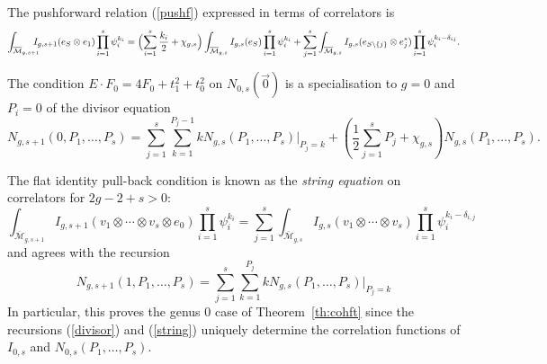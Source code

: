 \documentclass[11pt]{article}
\newcommand{\modm}{\mathcal{M}}
\theoremstyle{plain}
\theoremstyle{definition}
\begin{document}
The pushforward relation (\ref{pushf}) expressed in terms of correlators is \cite{ACNP}
$$
\int_{\overline{\modm}_{g,s+1}}\hspace{-3mm}I_{g,s+1}(e_S\otimes e_1)\prod_{i=1}^s\psi_i^{k_i}
=\Bigl(\sum_{i=1}^s \frac{k_i}{2}+\chi_{g,s}\Bigr)
\int_{\overline{\modm}_{g,s}}I_{g,s}(e_S)\prod_{i=1}^s\psi_i^{k_i}+\sum_{j=1}^s\int_{\overline{\modm}_{g,s}}I_{g,s}(e_{S\backslash\{j\}}\otimes e^*_j)\prod_{i=1}^s\psi_i^{k_i-\delta_{ij}}.
$$

The condition $E\cdot F_0=4F_0+t_1^2+t_0^2$ on $N_{0,s}(\vec{0})$ is a specialisation to $g=0$ and $P_i=0$ of the divisor equation \cite{NorStr}
\begin{equation}   \label{divisor}
N_{g,s+1}(0,P_1,\dots,P_s)=\sum_{j=1}^s\sum_{k=1}^{P_j-1}kN_{g,s}(P_1,...,P_s)|_{P_j=k}+\left(\frac{1}{2}\sum_{j=1}^s P_j+\chi_{g,s}\right)N_{g,s}(P_1,\dots,P_s).
\end{equation} 


The flat identity pull-back condition is known as the {\em string equation} on correlators for $2g-2+s>0$:
$$\int_{\overline{\modm}_{g,s+1}}I_{g,s+1}(v_1\otimes\cdots\otimes v_s\otimes e_0)\prod_{i=1}^s\psi_i^{k_i}
=\sum_{j=1}^s\int_{\overline{\modm}_{g,s}}I_{g,s}(v_1\otimes\cdots\otimes v_s)\prod_{i=1}^s\psi_i^{k_i-\delta_{i,j}}
$$
and agrees with the recursion \cite{NorStr}
\begin{equation}   \label{string}
N_{g,s+1}(1,P_1,\dots,P_s)=\sum_{j=1}^s\sum_{k=1}^{P_j}kN_{g,s}(P_1,\dots,P_s)|_{P_j=k}
\end{equation}
In particular, this proves the genus 0 case of Theorem~\ref{th:cohft} since the recursions (\ref{divisor}) and (\ref{string}) uniquely determine the correlation functions of $I_{0,s}$ and $N_{0,s}(P_1,\dots,P_s)$.

\end{document}
